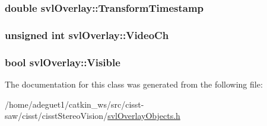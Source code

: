 \hypertarget{classsvl_overlay_a5b67a9b8184c00fd1f1eddf10714efc0}{
\subsubsection[{Transform\-Timestamp}]{\setlength{\rightskip}{0pt plus 5cm}double svl\-Overlay\-::\-Transform\-Timestamp\hspace{0.3cm}{\ttfamily [protected]}}}\label{classsvl_overlay_a5b67a9b8184c00fd1f1eddf10714efc0}
\hypertarget{classsvl_overlay_a3cb587204bc369c7f692d0db7cb74e72}{
\subsubsection[{Video\-Ch}]{\setlength{\rightskip}{0pt plus 5cm}unsigned int svl\-Overlay\-::\-Video\-Ch\hspace{0.3cm}{\ttfamily [protected]}}}\label{classsvl_overlay_a3cb587204bc369c7f692d0db7cb74e72}
\hypertarget{classsvl_overlay_a9cdf3aba60b4c4a291a5adc1c1cba139}{
\subsubsection[{Visible}]{\setlength{\rightskip}{0pt plus 5cm}bool svl\-Overlay\-::\-Visible\hspace{0.3cm}{\ttfamily [protected]}}}\label{classsvl_overlay_a9cdf3aba60b4c4a291a5adc1c1cba139}


The documentation for this class was generated from the following file\-:\begin{DoxyCompactItemize}
\item 
/home/adeguet1/catkin\-\_\-ws/src/cisst-\/saw/cisst/cisst\-Stereo\-Vision/\hyperlink{svl_overlay_objects_8h}{svl\-Overlay\-Objects.\-h}\end{DoxyCompactItemize}
